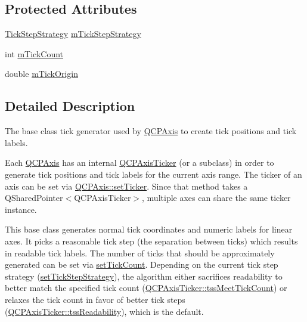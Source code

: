 \subsection*{Protected Attributes}
\begin{DoxyCompactItemize}
\item 
\hyperlink{class_q_c_p_axis_ticker_ab6d2f9d9477821623ac9bc4b21ddf49a}{Tick\+Step\+Strategy} \hyperlink{class_q_c_p_axis_ticker_ac059d6d670b2f6132c593fb4de156701}{m\+Tick\+Step\+Strategy}
\item 
int \hyperlink{class_q_c_p_axis_ticker_a14a35b47d1aad11b08d18ea0e25937b8}{m\+Tick\+Count}
\item 
double \hyperlink{class_q_c_p_axis_ticker_a560ef9347b1aa599a9bf0e2f29d3ec16}{m\+Tick\+Origin}
\end{DoxyCompactItemize}


\subsection{Detailed Description}
The base class tick generator used by \hyperlink{class_q_c_p_axis}{Q\+C\+P\+Axis} to create tick positions and tick labels. 

Each \hyperlink{class_q_c_p_axis}{Q\+C\+P\+Axis} has an internal \hyperlink{class_q_c_p_axis_ticker}{Q\+C\+P\+Axis\+Ticker} (or a subclass) in order to generate tick positions and tick labels for the current axis range. The ticker of an axis can be set via \hyperlink{class_q_c_p_axis_a4ee03fcd2c74d05cd1a419b9af5cfbdc}{Q\+C\+P\+Axis\+::set\+Ticker}. Since that method takes a {\ttfamily Q\+Shared\+Pointer$<$\+Q\+C\+P\+Axis\+Ticker$>$}, multiple axes can share the same ticker instance.

This base class generates normal tick coordinates and numeric labels for linear axes. It picks a reasonable tick step (the separation between ticks) which results in readable tick labels. The number of ticks that should be approximately generated can be set via \hyperlink{class_q_c_p_axis_ticker_a47752abba8293e6dc18491501ae34008}{set\+Tick\+Count}. Depending on the current tick step strategy (\hyperlink{class_q_c_p_axis_ticker_a73b1d847c1a12159af6bfda4ebebe7d5}{set\+Tick\+Step\+Strategy}), the algorithm either sacrifices readability to better match the specified tick count (\hyperlink{class_q_c_p_axis_ticker_ab6d2f9d9477821623ac9bc4b21ddf49aa770312b6b9b0c64a37ceeba96e0cd7f2}{Q\+C\+P\+Axis\+Ticker\+::tss\+Meet\+Tick\+Count}) or relaxes the tick count in favor of better tick steps (\hyperlink{class_q_c_p_axis_ticker_ab6d2f9d9477821623ac9bc4b21ddf49aa9002aa2fd5633ab5556c71a26fed63a8}{Q\+C\+P\+Axis\+Ticker\+::tss\+Readability}), which is the default.

